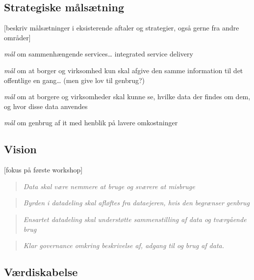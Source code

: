 \subsection{Strategiske målsætning}\label{strategiske-muxe5lsuxe6tning}

{[}beskriv målsætninger i eksisterende aftaler og strategier, også gerne
fra andre områder{]}

\begin{description}
\tightlist
\item[Interoperability]
\emph{mål} om sammenhængende services\ldots{} integrated service
delivery
\item[Once-only]
\emph{mål} om at borger og virksomhed kun skal afgive den samme
information til det offentlige en gang\ldots{} (men give lov til
genbrug?)
\item[Transperancy]
\emph{mål} om at borgere og virksomheder skal kunne se, hvilke data der
findes om dem, og hvor disse data anvendes
\item[Re-use]
\emph{mål} om genbrug af it med henblik på lavere omkostninger
\end{description}

\subsection{Vision}\label{vision}

{[}fokus på første workshop{]}

\begin{quote}
\emph{Data skal være nemmere at bruge og sværere at misbruge}
\end{quote}

\begin{quote}
\emph{Byrden i datadeling skal afløftes fra dataejeren, hvis den
begrænser genbrug}
\end{quote}

\begin{quote}
\emph{Ensartet datadeling skal understøtte sammenstilling af data og
tværgående brug}
\end{quote}

\begin{quote}
\emph{Klar governance omkring beskrivelse af, adgang til og brug af
data.}
\end{quote}

\subsection{Værdiskabelse}\label{vuxe6rdiskabelse}

